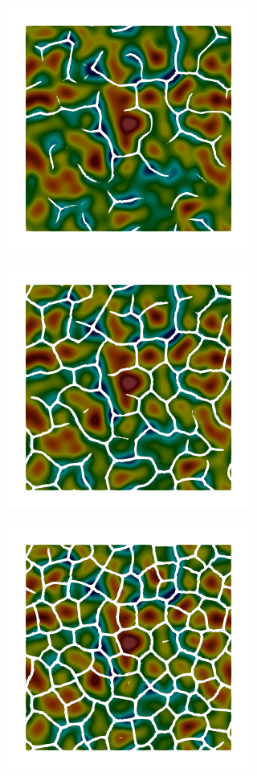 \begin{figure}[!htbp]
    \begin{subfigure}[b]{0.25\textwidth}
        \includegraphics[width=0.7\textwidth]{past/figures/Gc_sqexp_cartesian_5_5_rho_0_seed_a_with_crack_140.png}
    \end{subfigure}
    \begin{subfigure}[b]{0.25\textwidth}
        \includegraphics[width=0.7\textwidth]{past/figures/Gc_sqexp_cartesian_5_5_rho_0_seed_a_with_crack_160.png}
    \end{subfigure}
    \begin{subfigure}[b]{0.25\textwidth}
        \includegraphics[width=0.7\textwidth]{past/figures/Gc_sqexp_cartesian_5_5_rho_0_seed_a_with_crack_220.png}

\end{subfigure}
\end{figure}
